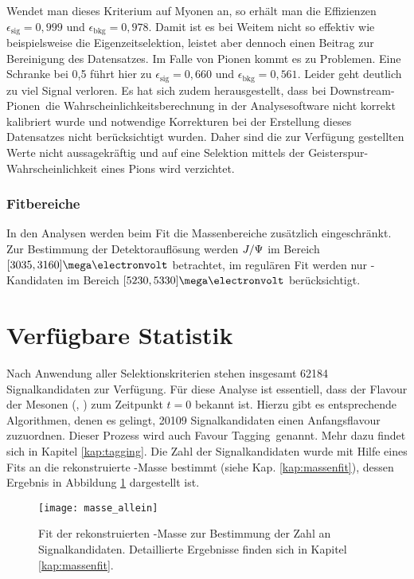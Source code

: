 Wendet man dieses Kriterium auf Myonen an, so erhält man die Effizienzen $\epsilon_{\text{sig}}=0,999$ und $\epsilon_{\text{bkg}}=0,978$. Damit ist es bei Weitem nicht so effektiv wie beispielsweise die Eigenzeitselektion, leistet aber dennoch einen Beitrag zur Bereinigung des Datensatzes. Im Falle von Pionen kommt es zu Problemen. Eine Schranke bei 0,5 führt hier zu $\epsilon_{\text{sig}}=0,660$ und $\epsilon_{\text{bkg}}=0,561$. Leider geht deutlich zu viel Signal verloren. Es hat sich zudem herausgestellt, dass bei \glqq Downstream-Pionen\grqq\ die Wahrscheinlichkeitsberechnung in der Analysesoftware nicht korrekt kalibriert wurde und notwendige Korrekturen bei der Erstellung dieses Datensatzes nicht berücksichtigt wurden. Daher sind die zur Verfügung gestellten Werte nicht aussagekräftig und auf eine Selektion mittels der Geisterspur-Wahrscheinlichkeit eines Pions wird verzichtet.

\subsubsection{Fitbereiche}
In den Analysen werden beim Fit die Massenbereiche zusätzlich eingeschränkt. Zur Bestimmung der Detektorauflösung werden $J/\Psi$ im Bereich $[3035, 3160]\mega\electronvolt$ betrachtet, im regulären Fit werden nur \Bd-Kandidaten im Bereich \linebreak$[5230, 5330]\mega\electronvolt$ berücksichtigt.

\section{Verfügbare Statistik}
Nach Anwendung aller Selektionskriterien stehen insgesamt 62184 Signalkandidaten zur Verfügung. Für diese Analyse ist essentiell, dass der Flavour der Mesonen (\Bd, \Bdbar) zum Zeitpunkt $t=0$ bekannt ist. Hierzu gibt es entsprechende Algorithmen, denen es gelingt, 20109 Signalkandidaten einen Anfangsflavour zuzuordnen. Dieser Prozess wird auch \glqq Favour Tagging\grqq\ genannt. Mehr dazu findet sich in Kapitel \ref{kap:tagging}. Die Zahl der Signalkandidaten wurde mit Hilfe eines Fits an die rekonstruierte \Bd-Masse bestimmt (siehe Kap. \ref{kap:massenfit}), dessen Ergebnis in Abbildung \ref{fig:masse_allein} dargestellt ist.
\begin{figure}[hptb]
\centering
\texttt{[image: masse\_allein]}
\caption{Fit der rekonstruierten \Bd-Masse zur Bestimmung der Zahl an Signalkandidaten. Detaillierte Ergebnisse finden sich in Kapitel \ref{kap:massenfit}.}
\label{fig:masse_allein}
\end{figure}